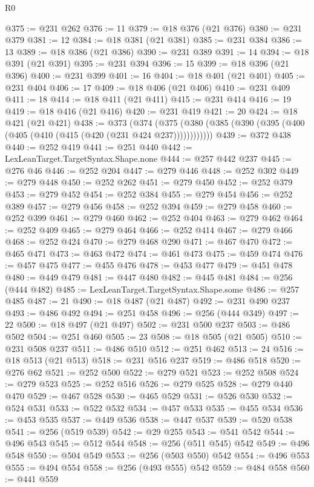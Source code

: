 \begin{lexlean}{R0}
\begin{coremodule}
@375 := @231 @262
@376 := 11
@379 := @18 @376 (@21 @376)
@380 := @231 @379
@381 := 12
@384 := @18 @381 (@21 @381)
@385 := @231 @384
@386 := 13
@389 := @18 @386 (@21 @386)
@390 := @231 @389
@391 := 14
@394 := @18 @391 (@21 @391)
@395 := @231 @394
@396 := 15
@399 := @18 @396 (@21 @396)
@400 := @231 @399
@401 := 16
@404 := @18 @401 (@21 @401)
@405 := @231 @404
@406 := 17
@409 := @18 @406 (@21 @406)
@410 := @231 @409
@411 := 18
@414 := @18 @411 (@21 @411)
@415 := @231 @414
@416 := 19
@419 := @18 @416 (@21 @416)
@420 := @231 @419
@421 := 20
@424 := @18 @421 (@21 @421)
@438 := @373
    (@374 (@375 (@380 (@385 (@390 (@395 (@400 (@405 (@410 (@415 (@420 (@231 @424 @237))))))))))))
@439 := @372 @438
@440 := @252 @419
@441 := @251 @440
@442 := LexLeanTarget.TargetSyntax.Shape.none
@444 := @257 @442 @237
@445 := @276 @46
@446 := @252 @204
@447 := @279 @446
@448 := @252 @302
@449 := @279 @448
@450 := @252 @262
@451 := @279 @450
@452 := @252 @379
@453 := @279 @452
@454 := @252 @384
@455 := @279 @454
@456 := @252 @389
@457 := @279 @456
@458 := @252 @394
@459 := @279 @458
@460 := @252 @399
@461 := @279 @460
@462 := @252 @404
@463 := @279 @462
@464 := @252 @409
@465 := @279 @464
@466 := @252 @414
@467 := @279 @466
@468 := @252 @424
@470 := @279 @468 @290
@471 := @467 @470
@472 := @465 @471
@473 := @463 @472
@474 := @461 @473
@475 := @459 @474
@476 := @457 @475
@477 := @455 @476
@478 := @453 @477
@479 := @451 @478
@480 := @449 @479
@481 := @447 @480
@482 := @445 @481
@484 := @256 (@444 @482)
@485 := LexLeanTarget.TargetSyntax.Shape.some
@486 := @257 @485
@487 := 21
@490 := @18 @487 (@21 @487)
@492 := @231 @490 @237
@493 := @486 @492
@494 := @251 @458
@496 := @256 (@444 @349)
@497 := 22
@500 := @18 @497 (@21 @497)
@502 := @231 @500 @237
@503 := @486 @502
@504 := @251 @460
@505 := 23
@508 := @18 @505 (@21 @505)
@510 := @231 @508 @237
@511 := @486 @510
@512 := @251 @462
@513 := 24
@516 := @18 @513 (@21 @513)
@518 := @231 @516 @237
@519 := @486 @518
@520 := @276 @62
@521 := @252 @500
@522 := @279 @521
@523 := @252 @508
@524 := @279 @523
@525 := @252 @516
@526 := @279 @525
@528 := @279 @440 @470
@529 := @467 @528
@530 := @465 @529
@531 := @526 @530
@532 := @524 @531
@533 := @522 @532
@534 := @457 @533
@535 := @455 @534
@536 := @453 @535
@537 := @449 @536
@538 := @447 @537
@539 := @520 @538
@541 := @256 (@519 @539)
@542 := @29 @255
@543 := @541 @542
@544 := @496 @543
@545 := @512 @544
@548 := @256 (@511 @545) @542
@549 := @496 @548
@550 := @504 @549
@553 := @256 (@503 @550) @542
@554 := @496 @553
@555 := @494 @554
@558 := @256 (@493 @555) @542
@559 := @484 @558
@560 := @441 @559

\end{coremodule}
\end{lexlean}
